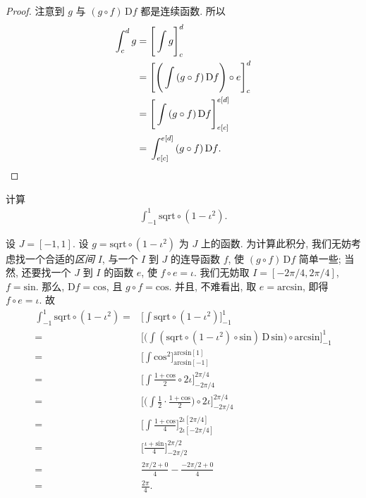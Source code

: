 \begin{proof}
    注意到 $g$ 与 $(g \circ f)\,\mathrm{D}f$ 都是连续函数. 所以
    \begin{align*}
        \int_{c}^{d} {g}
        = {} & \Bigg[ \int {g} \Bigg]_{c}^{d}                          \\
        = {} & \Bigg[ \Bigg( \int {(g \circ f)\,\mathrm{D}f} \Bigg)
        \circ e \Bigg]_{c}^{d}                                         \\
        = {} & \Bigg[ \int {(g \circ f)\,\mathrm{D}f} \Bigg]
        _{e[c]}^{e[d]}                                                 \\
        = {} & \int_{e[c]}^{e[d]} {(g \circ f)\,\mathrm{D}f}. \qedhere
    \end{align*}
\end{proof}

\begin{example}
    计算
    \begin{align*}
        \int_{-1}^{1} {\mathrm{sqrt} \circ (1 - \iota^2)}.
    \end{align*}

    设 $J = [-1, 1]$. 设 $g = \mathrm{sqrt} \circ (1 - \iota^2)$ 为 $J$ 上的函数. 为计算此积分, 我们无妨考虑找一个合适的\emph{区间} $I$, 与一个 $I$ 到 $J$ 的连导函数 $f$, 使 $(g \circ f)\,\mathrm{D}f$ 简单一些; 当然, 还要找一个 $J$ 到 $I$ 的函数 $e$, 使 $f \circ e = \iota$. 我们无妨取 $I = [-2\pi/4, 2\pi/4]$, $f = \mathrm{sin}$. 那么, $\mathrm{D}f = \mathrm{cos}$, 且 $g \circ f = \mathrm{cos}$. 并且, 不难看出, 取 $e = \mathrm{arcsin}$, 即得 $f \circ e = \iota$. 故
    \begin{align*}
        \int_{-1}^{1} {\mathrm{sqrt} \circ (1 - \iota^2)}
        = {} & \Bigg[ \int {\mathrm{sqrt} \circ (1 - \iota^2)} \Bigg]_{-1}^{1}   \\
        = {} & \Bigg[ \Bigg( \int {(\mathrm{sqrt} \circ (1 - \iota^2)
                \circ \mathrm{sin})\,\mathrm{D}\,\mathrm{sin}} \Bigg)
        \circ \mathrm{arcsin} \Bigg]_{-1}^{1}                                    \\
        = {} & \Bigg[ \int {\mathrm{cos}^2} \Bigg]
        _{\mathrm{arcsin}[-1]}^{\mathrm{arcsin}[1]}                              \\
        = {} & \Bigg[ \int {\frac{1 + \mathrm{cos}}{2} \circ {2\iota}} \Bigg]
        _{-2\pi/4}^{2\pi/4}                                                      \\
        = {} & \Bigg[ \Bigg( \int {\frac{1}{2} \cdot \frac{1 + \mathrm{cos}}{2}}
        \Bigg) \circ {2\iota} \Bigg]_{-2\pi/4}^{2\pi/4}                          \\
        = {} & \Bigg[ \int {\frac{1 + \mathrm{cos}}{4}}
        \Bigg]_{2\iota[-2\pi/4]}^{2\iota[2\pi/4]}                                \\
        = {} & \Bigg[ \frac{\iota + \mathrm{sin}}{4}
        \Bigg]_{-2\pi/2}^{2\pi/2}                                                \\
        = {} & \frac{2\pi/2 + 0}{4} - \frac{-2\pi/2 + 0}{4}                      \\
        = {} & \frac{2\pi}{4}.
    \end{align*}
\end{example}

